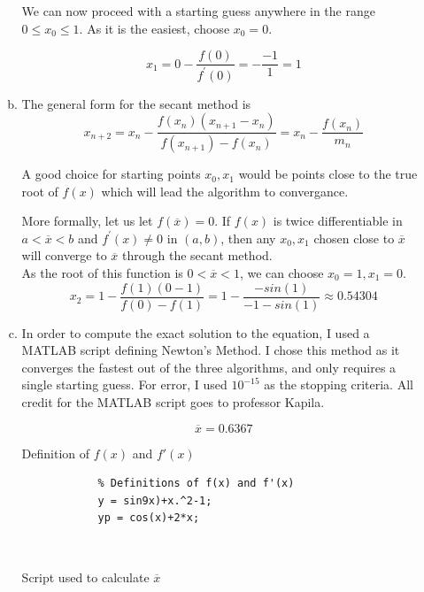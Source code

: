 \documentclass[11pt]{article}
\begin{document}
\begin{enumerate}
\begin{enumerate}[(a)]
		We can now proceed with a starting guess anywhere in the range $0 \leq x_0 \leq 1$. As it is the easiest, choose $x_0 = 0$.

		$$x_1 = 0 - \frac{f(0)}{f^{'}(0)} = -\frac{-1}{1} = 1$$

		\item The general form for the secant method is
			$$x_{n+2} = x_{n} - \frac{f(x_n)(x_{n+1}-x_n)}{f(x_{n+1})-f(x_n)} = x_n - \frac{f(x_n)}{m_n} $$

			A good choice for starting points $x_0, x_1$ would be points close to the true root of $f(x)$ which will lead the
			algorithm to convergance.

			More formally, let us let $f(\overline{x})=0$. If $f(x)$ is twice differentiable in
			$a < \overline{x} < b$ and $f^{'}(x) \neq 0$ in $(a,b)$, then any $x_0, x_1$ chosen close to $\overline{x}$ will
			converge to $\overline{x}$ through the secant method. \\

			As the root of this function is $0 < \overline{x} < 1$, we can choose $x_0 = 1, x_1 = 0$.
			$$x_2 = 1 - \frac{f(1)(0-1)}{f(0)-f(1)} = 1- \frac{-sin(1)}{-1-sin(1)} \approx 0.54304$$

		\item In order to compute the exact solution to the equation, I used a MATLAB script defining Newton's Method. I chose this
			method as it converges the fastest out of the three algorithms, and only requires a single starting guess. For error,
			I used $10^{-15}$ as the stopping criteria. All credit for the MATLAB script goes to professor Kapila.

			$$\overline{x} = 0.6367$$

			\begin{center}
				Definition of $f(x)$ and $f'(x)$
			\end{center}

			\begin{verbatim}
			% Definitions of f(x) and f'(x)
			y = sin9x)+x.^2-1;
			yp = cos(x)+2*x;
			\end{verbatim} \

			\begin{center}
				Script used to calculate $\overline{x}$
			\end{center}

			



\end{enumerate}
\end{enumerate}
\end{document}
